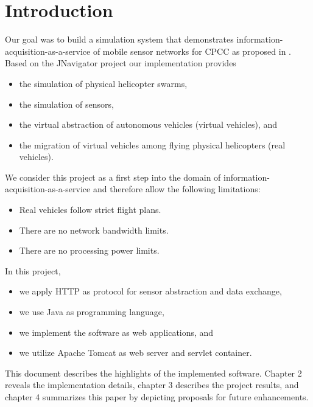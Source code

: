 
\chapter{Introduction}

Our goal was to build a simulation system that demonstrates information-acquisition-as-a-service
of mobile sensor networks for \ac{CPCC} as proposed in \cite{HotCloud10}.
Based on the JNavigator project \cite{CKrainer2009} our implementation provides
\begin{itemize}
	\item the simulation of physical helicopter swarms,
	\item the simulation of sensors,
	\item the virtual abstraction of autonomous vehicles (virtual vehicles), and
	\item the migration of virtual vehicles among flying physical helicopters (real vehicles).
\end{itemize} 

We consider this project as a first step into the domain of information-acquisition-as-a-service
and therefore allow the following limitations:
\begin{itemize}
	\item Real vehicles follow strict flight plans.
	\item There are no network bandwidth limits.
	\item There are no processing power limits.
\end{itemize} 


In this project,
\begin{itemize}
	\item we apply \acs{HTTP} \cite{RFC_2616} as protocol for sensor abstraction and data exchange,
	\item we use Java as programming language,
	\item we implement the software as web applications, and
	\item we utilize Apache Tomcat \cite{TOMCAT2012} as web server and servlet container.
\end{itemize} 

This document describes the highlights of the implemented software.
Chapter 2 reveals the implementation details,
chapter 3 describes the project results,
and chapter 4 summarizes this paper by depicting proposals for future enhancements.
